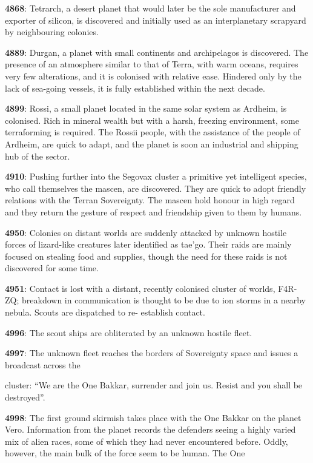 \textbf{4868}: Tetrarch, a desert planet that would later be the sole manufacturer and exporter of silicon, is discovered and initially used as an interplanetary scrapyard by neighbouring colonies.

\textbf{4889}: Durgan, a planet with small continents and archipelagos is discovered. The presence of an atmosphere similar to that of Terra, with warm oceans, requires very few alterations, and it is colonised with relative ease. Hindered only by the lack of sea-going vessels, it is fully established within the next decade.

\textbf{4899}: Rossi, a small planet located in the same solar system as Ardheim, is colonised. Rich in mineral wealth but with a harsh, freezing environment, some terraforming is required. The Rossii people, with the assistance of the people of Ardheim, are quick to adapt, and the planet is soon an industrial and shipping hub of the sector.

\textbf{4910}: Pushing further into the Segovax cluster a primitive yet intelligent species, who call themselves the mascen, are discovered. They are quick to adopt friendly relations with the Terran Sovereignty. The mascen hold honour in high regard and they return the gesture of respect and friendship given to them by humans.

\textbf{4950}: Colonies on distant worlds are suddenly attacked by unknown hostile forces of lizard-like creatures later identified as tae'go. Their raids are mainly focused on stealing food and supplies, though the need for these raids is not discovered for some time.

\textbf{4951}: Contact is lost with a distant, recently colonised cluster of worlds, F4R-ZQ; breakdown in communication is thought to be due to ion storms in a nearby nebula. Scouts are dispatched to re- establish contact.

\textbf{4996}: The scout ships are obliterated by an unknown hostile fleet.

\textbf{4997}: The unknown fleet reaches the borders of Sovereignty space and issues a broadcast across the

cluster: ``We are the One Bakkar, surrender and join us. Resist and you shall be destroyed''.

\textbf{4998}: The first ground skirmish takes place with the One Bakkar on the planet Vero. Information from the planet records the defenders seeing a highly varied mix of alien races, some of which they had never encountered before. Oddly, however, the main bulk of the force seem to be human. The One

